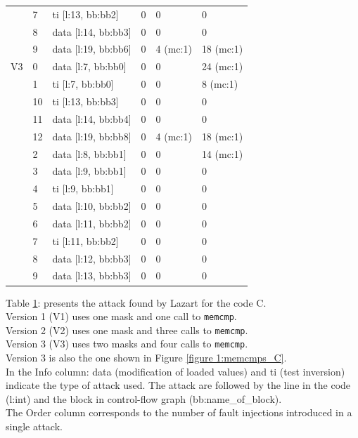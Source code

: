 \begin{table}[H]
{\begin{tabular}{l|l|l|l|l|l}
                    & 7  & ti [l:13, bb:bb2]   & 0       & 0        & 0          \\
                    & 8  & data [l:14, bb:bb3] & 0       & 0        & 0          \\
                    & 9  & data [l:19, bb:bb6] & 0       & 4 (mc:1) & 18 (mc:1)  \\
            \midrule
            V3      & 0  & data [l:7, bb:bb0]  & 0       & 0        & 24 (mc:1)  \\
                    & 1  & ti [l:7, bb:bb0]    & 0       & 0        & 8 (mc:1)   \\
                    & 10 & ti [l:13, bb:bb3]   & 0       & 0        & 0          \\
                    & 11 & data [l:14, bb:bb4] & 0       & 0        & 0          \\
                    & 12 & data [l:19, bb:bb8] & 0       & 4 (mc:1) & 18 (mc:1)  \\
                    & 2  & data [l:8, bb:bb1]  & 0       & 0        & 14 (mc:1)  \\
                    & 3  & data [l:9, bb:bb1]  & 0       & 0        & 0          \\
                    & 4  & ti [l:9, bb:bb1]    & 0       & 0        & 0          \\
                    & 5  & data [l:10, bb:bb2] & 0       & 0        & 0          \\
                    & 6  & data [l:11, bb:bb2] & 0       & 0        & 0          \\
                    & 7  & ti [l:11, bb:bb2]   & 0       & 0        & 0          \\
                    & 8  & data [l:12, bb:bb3] & 0       & 0        & 0          \\
                    & 9  & data [l:13, bb:bb3] & 0       & 0        & 0          \\
            \bottomrule
        \end{tabular}       
        
    }
    \label{tab1:memcmps_C}
\end{table}

Table \ref{tab1:memcmps_C}: presents the attack found by Lazart for the code C.\\
Version 1 (V1) uses one mask and one call to \texttt{memcmp}.\\
Version 2 (V2) uses one mask and three calls to \texttt{memcmp}.\\
Version 3 (V3) uses two masks and four calls to \texttt{memcmp}.\\
Version 3 is also the one shown in Figure \ref{figure 1:memcmps_C}.\\
In the Info column: data (modification of loaded values) and ti (test inversion) indicate the type of attack used.
The attack are followed by the line in the code (l:int) and the block in control-flow graph (bb:name\_of\_block).\\
The Order column corresponds to the number of fault injections introduced in a single attack.

